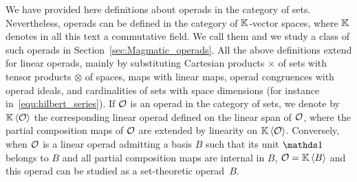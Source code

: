 We have provided here definitions about operads in the category of sets.
Nevertheless, operads can be defined in the category of $\mathbb{K}$-vector
spaces, where $\mathbb{K}$ denotes in all this text a commutative field. We call
them  and we study a class of such operads in
Section~\ref{sec:Magmatic_operads}. All the above definitions extend for
linear operads, mainly by substituting Cartesian products $\times$ of
sets with tensor products $\otimes$ of spaces, maps with linear maps,
operad congruences with operad ideals, and cardinalities of sets with
space dimensions (for instance in~\eqref{equ:hilbert_series}).
If $\mathcal{O}$ is an operad in the category of sets, we denote by
$\mathbb{K} \left\langle\mathcal{O}\right\rangle$ the corresponding linear operad defined on the
linear span of $\mathcal{O}$, where the partial composition maps of $\mathcal{O}$ are
extended by linearity on $\mathbb{K} \left\langle\mathcal{O}\right\rangle$. Conversely, when $\mathcal{O}$ is
a linear operad admitting a basis $B$ such that its unit $\Unit$
belongs to $B$ and all partial composition maps are internal in $B$,
$\mathcal{O} = \mathbb{K} \left\langle B\right\rangle$ and this operad can be studied as a
set-theoretic operad~$B$.
\medbreak


